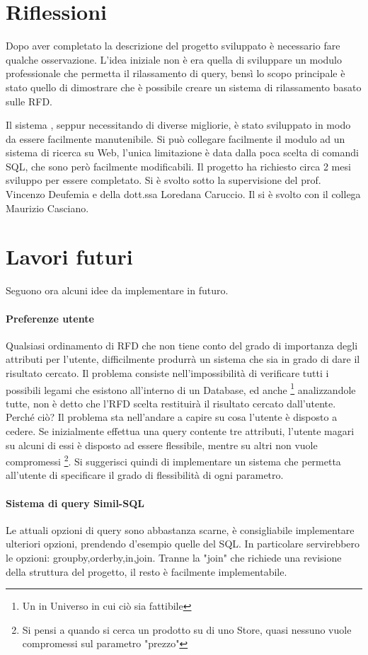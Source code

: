 \section{Riflessioni}
Dopo aver completato la descrizione del progetto sviluppato è necessario fare qualche osservazione.
L'idea iniziale non è era quella di sviluppare un modulo professionale che permetta il rilassamento di query, bensì lo scopo principale è stato quello di dimostrare che è possibile creare un sistema di rilassamento basato sulle RFD.

Il sistema , seppur necessitando di diverse migliorie, è stato sviluppato in modo da essere facilmente manutenibile. 
Si può collegare facilmente il modulo ad un sistema di ricerca su Web, l'unica limitazione è data dalla poca scelta di comandi SQL, che sono però facilmente modificabili.
Il progetto ha richiesto circa 2 mesi sviluppo per essere completato. Si è svolto sotto la supervisione del prof. Vincenzo Deufemia e della dott.ssa Loredana Caruccio. Il si è svolto con il collega Maurizio Casciano.

\section{Lavori futuri}
Seguono ora alcuni idee da implementare in futuro.
\paragraph{Preferenze utente}
Qualsiasi ordinamento di RFD che non tiene conto del grado di importanza degli attributi per l'utente, difficilmente produrrà un sistema che sia in grado di dare il risultato cercato.
Il problema consiste nell'impossibilità di verificare tutti i possibili legami che esistono all'interno di un Database, ed anche \footnote{Un in Universo in cui ciò sia fattibile} analizzandole tutte, non è detto che l'RFD scelta restituirà il risultato cercato dall'utente. Perché ciò?
Il problema sta nell'andare a capire su cosa l'utente è disposto a cedere. Se inizialmente effettua una query contente tre attributi, l'utente magari su alcuni di essi è disposto ad essere flessibile, mentre su altri non vuole compromessi \footnote{Si pensi a quando si cerca un prodotto su di uno Store, quasi nessuno vuole compromessi sul parametro "prezzo"}.
Si suggerisci quindi di implementare un sistema che permetta all'utente di specificare il grado di flessibilità di ogni parametro.
\paragraph{Sistema di query Simil-SQL}
Le attuali opzioni di query sono abbastanza scarne, è consigliabile implementare ulteriori opzioni, prendendo d'esempio quelle del SQL. In particolare servirebbero le opzioni: groupby,orderby,in,join.
Tranne la "join" che richiede una revisione della struttura del progetto, il resto è facilmente implementabile.
